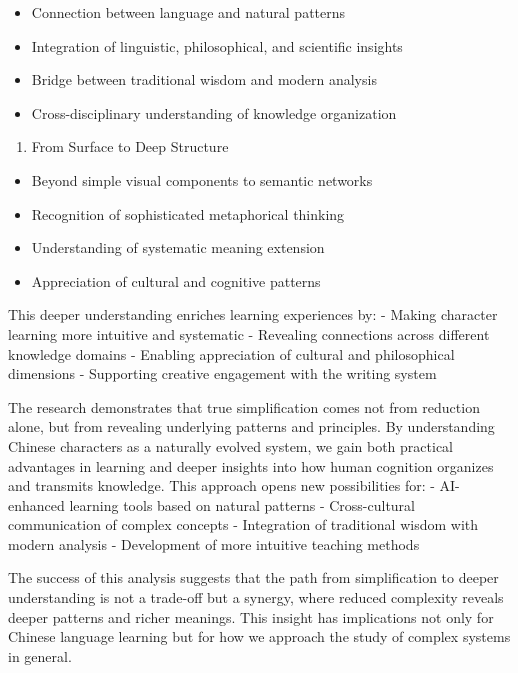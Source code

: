 \documentclass[11pt,letterpaper]{article}
\begin{document}
\begin{itemize}
\tightlist
\item
  Connection between language and natural patterns
\item
  Integration of linguistic, philosophical, and scientific insights
\item
  Bridge between traditional wisdom and modern analysis
\item
  Cross-disciplinary understanding of knowledge organization
\end{itemize}

\begin{enumerate}
\def\labelenumi{\arabic{enumi}.}
\setcounter{enumi}{3}
\tightlist
\item
  From Surface to Deep Structure
\end{enumerate}

\begin{itemize}
\tightlist
\item
  Beyond simple visual components to semantic networks
\item
  Recognition of sophisticated metaphorical thinking
\item
  Understanding of systematic meaning extension
\item
  Appreciation of cultural and cognitive patterns
\end{itemize}

This deeper understanding enriches learning experiences by: - Making
character learning more intuitive and systematic - Revealing connections
across different knowledge domains - Enabling appreciation of cultural
and philosophical dimensions - Supporting creative engagement with the
writing system

The research demonstrates that true simplification comes not from
reduction alone, but from revealing underlying patterns and principles.
By understanding Chinese characters as a naturally evolved system, we
gain both practical advantages in learning and deeper insights into how
human cognition organizes and transmits knowledge. This approach opens
new possibilities for: - AI-enhanced learning tools based on natural
patterns - Cross-cultural communication of complex concepts -
Integration of traditional wisdom with modern analysis - Development of
more intuitive teaching methods

The success of this analysis suggests that the path from simplification
to deeper understanding is not a trade-off but a synergy, where reduced
complexity reveals deeper patterns and richer meanings. This insight has
implications not only for Chinese language learning but for how we
approach the study of complex systems in general.
\end{document}
